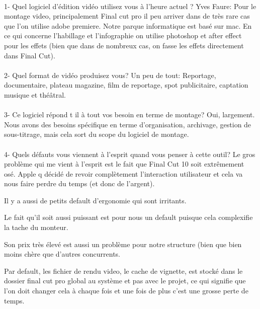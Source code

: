 \paragraph{}
1-  Quel logiciel d'édition vidéo utilisez vous à l'heure actuel ?
Yves Faure: Pour le montage video, principalement Final cut pro il peu
arriver dans de très rare cas que l'on utilise adobe premiere. Notre
parque informatique est basé sur mac. En ce qui concerne l'habillage et
l'infographie on utilise photoshop et  after effect pour les effets (bien
que dans de nombreux cas, on fasse les effets directement dans Final Cut).

\paragraph{}
2- Quel format de vidéo produisez vous?
Un peu de tout: Reportage, documentaire, plateau magazine, film de reportage, spot
publicitaire, captation musique et théâtral.

\paragraph{}
3- Ce logiciel répond t il à tout vos besoin en terme de montage?
Oui, largement. Nous avons des besoins spécifique en terme d'organisation,
archivage, gestion de sous-titrage, mais cela sort du scope du logiciel de
montage.

\paragraph{}
4- Quels défauts vous viennent à l'esprit quand vous penser à cette outil?
Le gros problème qui me vient à l'esprit est le fait que Final Cut 10 soit
extrêmement osé. Apple q décidé de revoir complètement l'interaction
utilisateur et cela va nous faire perdre du temps (et donc de l'argent). 

Il y a aussi de petits default d'ergonomie qui sont irritants.

Le fait qu'il soit aussi puissant est pour nous un default puisque cela
complexifie la tache du monteur.

Son prix très élevé est aussi un problème pour notre structure (bien que bien
moins chère que d'autres concurrents.

Par default, les fichier de rendu video, le cache de vignette, est stocké dans
le dossier final cut pro global au  système et pas avec le projet, ce qui
signifie que l'on doit changer cela à chaque fois et une fois de plus c'est une
grosse perte de temps.

